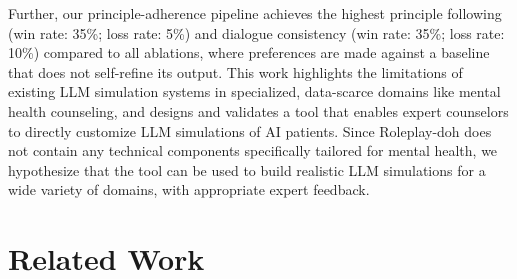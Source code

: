 \documentclass[11pt]{article}
\begin{document}
Further, our principle-adherence pipeline achieves the highest principle following (win rate: 35\%; loss rate: 5\%) and dialogue consistency (win rate: 35\%; loss rate: 10\%) compared to all ablations, where preferences are made against a baseline that does not self-refine its output. 
This work highlights the limitations of existing LLM simulation systems in specialized, data-scarce domains like mental health counseling, and designs and validates a tool that enables expert counselors to directly customize LLM simulations of AI patients.
Since Roleplay-doh does not contain any technical components specifically tailored for mental health, we hypothesize that the tool can be used to build realistic LLM simulations for a wide variety of domains, with appropriate expert feedback.

 \vspace{-0.05in}
\section{Related Work}\vspace{-0.05in}
\end{document}
